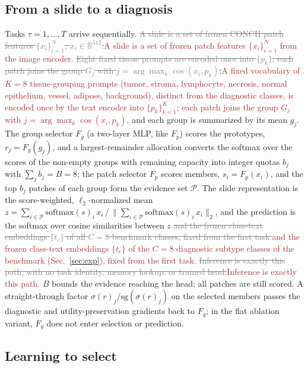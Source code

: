 \documentclass{article}
\newif\ifmarkup \markuptrue
\newcommand{\repc}[3]{\ifmarkup\textcolor{gray}{\sout{#2}}\textcolor{#1}{#3}\else#3\fi}
\newcommand{\repB}[2]{\repc{brown}{#1}{#2}}   %
\newcommand{\Fg}{F_g}
\newcommand{\Fp}{F_p}
\newcommand{\Psel}{\mathcal{P}}
\begin{document}
\subsection{From a slide to a diagnosis}
\label{ssec:setup}

Tasks $\tau=1,\ldots,T$ arrive sequentially. \repB{A slide is a set of frozen CONCH patch features $\{x_i\}_{i=1}^{N}$, $x_i\in\mathbb{R}^{512}$.}{A slide is a set of frozen patch features $\{x_i\}_{i=1}^{N}$ from the image encoder.} \repB{Eight fixed tissue prompts are encoded once into $\{p_k\}$; each patch joins the group $G_j$ with $j=\arg\max_k\cos(x_i,p_k)$,}{A fixed vocabulary of $K=8$ tissue-grouping prompts (tumor, stroma, lymphocyte, necrosis, normal epithelium, vessel, adipose, background), distinct from the diagnostic classes, is encoded once by the text encoder into $\{p_k\}_{k=1}^{K}$; each patch joins the group $G_j$ with $j=\arg\max_k\cos(x_i,p_k)$,} and each group is summarized by its mean $g_j$. The group selector $\Fg$ (a two-layer MLP, like $\Fp$) scores the prototypes, $r_j=\Fg(g_j)$, and a largest-remainder allocation converts the softmax over the scores of the non-empty groups with remaining capacity into integer quotas $b_j$ with $\sum_j b_j=B=8$; the patch selector $\Fp$ scores members, $s_i=\Fp(x_i)$, and the top $b_j$ patches of each group form the evidence set $\Psel$. The slide representation is the score-weighted, $\ell_2$-normalized mean $z=\sum_{i\in\Psel}\mathrm{softmax}(s)_i\,x_i\,/\,\bigl\|\sum_{i\in\Psel}\mathrm{softmax}(s)_i\,x_i\bigr\|_2$, and the prediction is the softmax over cosine similarities between $z$ \repB{and the frozen class-text embeddings $\{t_c\}$ of all $C=8$ benchmark classes, fixed from the first task.}{and the frozen class-text embeddings $\{t_c\}$ of the $C=8$ diagnostic subtype classes of the benchmark (Sec.~\ref{sec:exp}), fixed from the first task.} \repB{Inference is exactly this path, with no task identity, memory lookup, or trained head.}{Inference is exactly this path.} $B$ bounds the evidence reaching the head; all patches are still scored. A straight-through factor $\sigma(r)_j/\mathrm{sg}(\sigma(r)_j)$ on the selected members passes the diagnostic and utility-preservation gradients back to $\Fg$; in the flat ablation variant, $\Fg$ does not enter selection or prediction.



\subsection{Learning to select}
\label{ssec:within}
\end{document}
